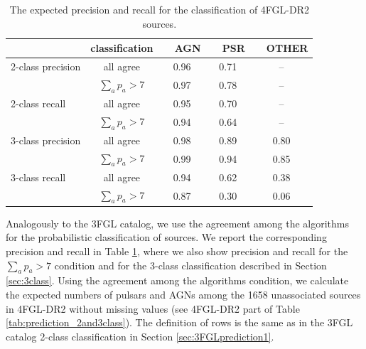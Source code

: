 \documentclass{aa}
\begin{document}
\begin{table}[!h]
    \caption{The expected precision and recall for the classification of 4FGL-DR2 sources.}
    \label{tab:prec_recall_4FGL}

\centering
    \tiny
  
 \renewcommand{\tabcolsep}{0.3mm}
\renewcommand{\arraystretch}{1.5}

    \begin{tabular}{l c c c c}
    \hline
    \hline
    & classification &\ \  AGN &\ \   PSR &\ \   OTHER \\
    \hline
    2-class precision & all     agree            & 0.96 &  0.71 & --  \\ 
                                & $\sum_a p_a > 7$ & 0.97 &  0.78  & -- \\
    \hline
    2-class recall       & all     agree            & 0.95 &  0.70 & --  \\ 
                                & $\sum_a p_a > 7$ & 0.94 &  0.64  & -- \\
    \hline
    3-class precision & all     agree            & 0.98 & 0.89  & 0.80  \\ 
                                & $\sum_a p_a > 7$ & 0.99 &  0.94  & 0.85 \\
    \hline
    3-class recall       & all     agree            & 0.94 &  0.62 & 0.38  \\ 
                                & $\sum_a p_a > 7$ & 0.87 &  0.30  & 0.06 \\
    \hline
    \end{tabular}%
\end{table}

Analogously to the 3FGL catalog, we use the agreement among the algorithms for the probabilistic classification of sources.
We report the corresponding precision and recall in Table \ref{tab:prec_recall_4FGL}, where we also show precision and recall
for the $\sum_a p_a > 7$ condition and for the 3-class classification described in Section \ref{sec:3class}.
Using the agreement among the algorithms condition,
we calculate the expected numbers of pulsars and AGNs among the 1658 unassociated sources in 4FGL-DR2 without missing values 
(see 4FGL-DR2 part of Table \ref{tab:prediction_2and3class}).
The definition of rows is the same as in the 3FGL catalog 2-class classification in Section \ref{sec:3FGLprediction1}.
\end{document}
